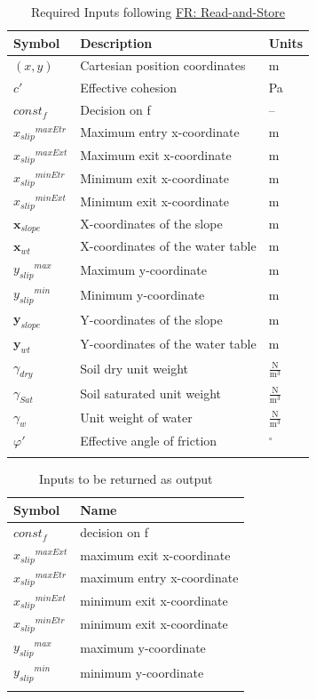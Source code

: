 \documentclass[12pt]{article}
\begin{document}
\begin{longtable}{l l l}
\toprule
Symbol & Description & Units
\\
\midrule
\endhead
$(x,y)$ & Cartesian position coordinates & m
\\
$c'$ & Effective cohesion & Pa
\\
$const_f$ & Decision on f & --
\\
${{x_{slip}}^{maxEtr}}$ & Maximum entry x-coordinate & m
\\
${{x_{slip}}^{maxExt}}$ & Maximum exit x-coordinate & m
\\
${{x_{slip}}^{minEtr}}$ & Minimum exit x-coordinate & m
\\
${{x_{slip}}^{minExt}}$ & Minimum exit x-coordinate & m
\\
${\mathbf{x}_{slope}}$ & X-coordinates of the slope & m
\\
${\mathbf{x}_{wt}}$ & X-coordinates of the water table & m
\\
${{y_{slip}}^{max}}$ & Maximum y-coordinate & m
\\
${{y_{slip}}^{min}}$ & Minimum y-coordinate & m
\\
${\mathbf{y}_{slope}}$ & Y-coordinates of the slope & m
\\
${\mathbf{y}_{wt}}$ & Y-coordinates of the water table & m
\\
${γ_{dry}}$ & Soil dry unit weight & $\frac{\text{N}}{\text{m}^{3}}$
\\
${γ_{Sat}}$ & Soil saturated unit weight & $\frac{\text{N}}{\text{m}^{3}}$
\\
${γ_{w}}$ & Unit weight of water & $\frac{\text{N}}{\text{m}^{3}}$
\\
$φ'$ & Effective angle of friction & ${}^{\circ}$
\\
\bottomrule
\caption{Required Inputs following \hyperref[readAndStore]{FR: Read-and-Store}}
\label{Table:ReqInputs}
\end{longtable}
\begin{longtable}{l l}
\toprule
Symbol & Name
\\
\midrule
\endhead
$const_f$ & decision on f
\\
${{x_{slip}}^{maxExt}}$ & maximum exit x-coordinate
\\
${{x_{slip}}^{maxEtr}}$ & maximum entry x-coordinate
\\
${{x_{slip}}^{minExt}}$ & minimum exit x-coordinate
\\
${{x_{slip}}^{minEtr}}$ & minimum exit x-coordinate
\\
${{y_{slip}}^{max}}$ & maximum y-coordinate
\\
${{y_{slip}}^{min}}$ & minimum y-coordinate
\\
\bottomrule
\caption{Inputs to be returned as output}
\label{Table:inputsToOutputTable}
\end{longtable}
\end{document}
